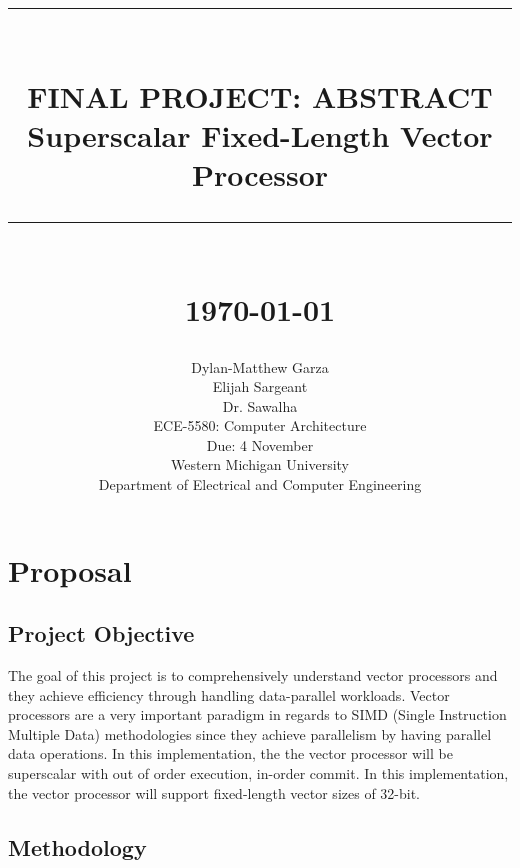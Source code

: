 \documentclass[12pt]{article}
\newcommand{\HRule}[1]{\rule{\linewidth}{#1}}
\newcommand{\Prof}{Dr. Sawalha}
\newcommand{\Class}{ECE-5580: Computer Architecture}
\newcommand{\Assignment}{Final Project: Abstract}
\newcommand{\Specifics}{Superscalar Fixed-Length Vector Processor}
\newcommand{\Due}{Due: 4 November}
\begin{document}
\title{ \normalsize \textsc{}
		\\ [2.0cm]
		\HRule{0.5pt} \\
		\LARGE \textbf{\uppercase{\Assignment}}\\
		\Specifics\\
        \HRule{2pt} \\ [0.5cm]
		\normalsize \today \vspace*{5\baselineskip}}

\date{}

\author{
        Dylan-Matthew Garza \\
        Elijah Sargeant\\ 
        \Prof\\
        \Class\\
        \Due\\
        Western Michigan University \\
        Department of Electrical and Computer Engineering 
    }
\singlespacing
\maketitle
\break
\tableofcontents
\clearpage
{}
\section{Proposal}
\subsection{Project Objective}
The goal of this project is to comprehensively understand vector processors and
they achieve efficiency through handling data-parallel workloads. Vector processors
are a very important paradigm in regards to SIMD (Single Instruction Multiple Data) 
methodologies since they achieve parallelism by having parallel data operations. In this 
implementation, the the vector processor will be superscalar with out of order execution, in-order 
commit. In this implementation, the vector processor will support fixed-length vector sizes
of 32-bit.
\subsection{Methodology}
\end{document}
